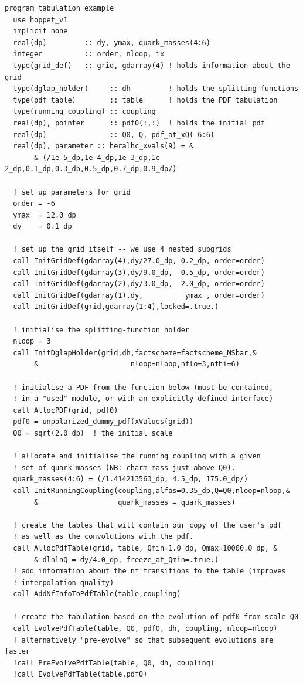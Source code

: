 \documentclass[12pt]{article}
\begin{document}
\begin{lstlisting}
program tabulation_example
  use hoppet_v1
  implicit none
  real(dp)         :: dy, ymax, quark_masses(4:6)
  integer          :: order, nloop, ix
  type(grid_def)   :: grid, gdarray(4) ! holds information about the grid
  type(dglap_holder)     :: dh         ! holds the splitting functions
  type(pdf_table)        :: table      ! holds the PDF tabulation
  type(running_coupling) :: coupling  
  real(dp), pointer      :: pdf0(:,:)  ! holds the initial pdf
  real(dp)               :: Q0, Q, pdf_at_xQ(-6:6)
  real(dp), parameter :: heralhc_xvals(9) = &
       & (/1e-5_dp,1e-4_dp,1e-3_dp,1e-2_dp,0.1_dp,0.3_dp,0.5_dp,0.7_dp,0.9_dp/)

  ! set up parameters for grid
  order = -6
  ymax  = 12.0_dp
  dy    = 0.1_dp
  
  ! set up the grid itself -- we use 4 nested subgrids
  call InitGridDef(gdarray(4),dy/27.0_dp, 0.2_dp, order=order)
  call InitGridDef(gdarray(3),dy/9.0_dp,  0.5_dp, order=order)
  call InitGridDef(gdarray(2),dy/3.0_dp,  2.0_dp, order=order)
  call InitGridDef(gdarray(1),dy,          ymax , order=order)
  call InitGridDef(grid,gdarray(1:4),locked=.true.)

  ! initialise the splitting-function holder
  nloop = 3
  call InitDglapHolder(grid,dh,factscheme=factscheme_MSbar,&
       &                      nloop=nloop,nflo=3,nfhi=6)

  ! initialise a PDF from the function below (must be contained,
  ! in a "used" module, or with an explicitly defined interface)
  call AllocPDF(grid, pdf0)
  pdf0 = unpolarized_dummy_pdf(xValues(grid))
  Q0 = sqrt(2.0_dp)  ! the initial scale

  ! allocate and initialise the running coupling with a given
  ! set of quark masses (NB: charm mass just above Q0).
  quark_masses(4:6) = (/1.414213563_dp, 4.5_dp, 175.0_dp/)
  call InitRunningCoupling(coupling,alfas=0.35_dp,Q=Q0,nloop=nloop,&
       &                   quark_masses = quark_masses)

  ! create the tables that will contain our copy of the user's pdf
  ! as well as the convolutions with the pdf.
  call AllocPdfTable(grid, table, Qmin=1.0_dp, Qmax=10000.0_dp, & 
       & dlnlnQ = dy/4.0_dp, freeze_at_Qmin=.true.)
  ! add information about the nf transitions to the table (improves
  ! interpolation quality)
  call AddNfInfoToPdfTable(table,coupling)

  ! create the tabulation based on the evolution of pdf0 from scale Q0
  call EvolvePdfTable(table, Q0, pdf0, dh, coupling, nloop=nloop)
  ! alternatively "pre-evolve" so that subsequent evolutions are faster
  !call PreEvolvePdfTable(table, Q0, dh, coupling)
  !call EvolvePdfTable(table,pdf0)


\end{lstlisting}
\end{document}
